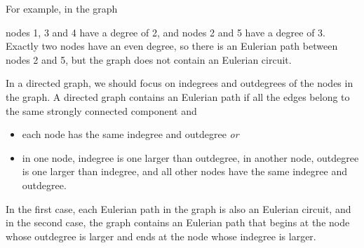 \begin{samepage}
For example, in the graph
\begin{center}
\end{center}
\end{samepage}
nodes 1, 3 and 4 have a degree of 2,
and nodes 2 and 5 have a degree of 3.
Exactly two nodes have an even degree,
so there is an Eulerian path between nodes 2 and 5,
but the graph does not contain an Eulerian circuit.

In a directed graph,
we should focus on indegrees and outdegrees
of the nodes in the graph.
A directed graph contains an Eulerian path
if all the edges belong to the same strongly
connected component and
\begin{itemize}
\item each node has the same indegree and outdegree \emph{or}
\item in one node, indegree is one larger than outdegree,
in another node, outdegree is one larger than indegree,
and all other nodes have the same indegree and outdegree.
\end{itemize}

In the first case, each Eulerian path in the graph
is also an Eulerian circuit,
and in the second case, the graph contains an Eulerian path
that begins at the node whose outdegree is larger
and ends at the node whose indegree is larger.

